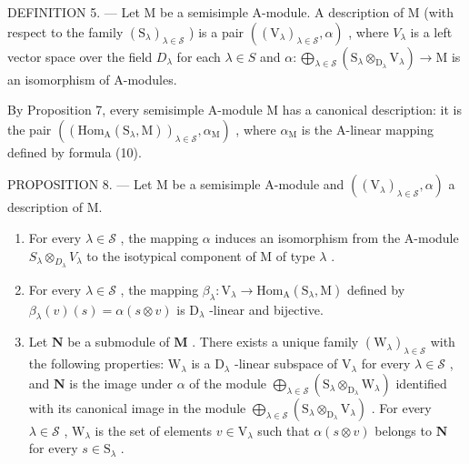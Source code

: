 DEFINITION 5. --- Let M be a semisimple A-module. A description of M (with respect to the family \((\mathrm{S}_{\lambda})_{\lambda\in\mathcal{S}}\) ) is a pair \(((\mathrm{V}_{\lambda})_{\lambda\in\mathcal{S}},\alpha)\) , where \(V_{\lambda}\) is a left vector space over the field \(D_{\lambda}\) for each \(\lambda\in S\) and \(\alpha:\bigoplus_{\lambda\in\mathcal{S}}(\mathrm{S}_{\lambda}\otimes_{\mathrm{D}_{\lambda}}\mathrm{V}_{\lambda})\to\mathrm{M}\) is an isomorphism of A-modules.

By Proposition 7, every semisimple A-module M has a canonical description: it is the pair \(\left(\left(\mathrm{Hom}_{\mathrm{A}}\left(\mathrm{S}_{\lambda},\mathrm{M}\right)\right)_{\lambda \in \mathcal{S}},\alpha_{\mathrm{M}}\right)\) , where \(\alpha_{\mathrm{M}}\) is the A-linear mapping defined by formula (10).

PROPOSITION 8. --- Let M be a semisimple A-module and \(((\mathrm{V}_{\lambda})_{\lambda \in \mathcal{S}}, \alpha)\) a description of M.

\begin{enumerate}
\def\labelenumi{\alph{enumi})}
\item
  For every \(\lambda \in \mathcal{S}\) , the mapping \(\alpha\) induces an isomorphism from the A-module \(S_{\lambda} \otimes_{D_{\lambda}} V_{\lambda}\) to the isotypical component of M of type \(\lambda\) .
\item
  For every \(\lambda \in \mathcal{S}\) , the mapping \(\beta_{\lambda} : \mathrm{V}_{\lambda} \to \mathrm{Hom}_{\mathrm{A}}(\mathrm{S}_{\lambda}, \mathrm{M})\) defined by \(\beta_{\lambda}(v)(s) = \alpha(s \otimes v)\) is \(\mathrm{D}_{\lambda}\) -linear and bijective.
\item
  Let \(\mathbf{N}\) be a submodule of \(\mathbf{M}\) . There exists a unique family \((\mathrm{W}_{\lambda})_{\lambda \in \mathcal{S}}\) with the following properties: \(\mathrm{W}_{\lambda}\) is a \(\mathrm{D}_{\lambda}\) -linear subspace of \(\mathrm{V}_{\lambda}\) for every \(\lambda \in \mathcal{S}\) , and \(\mathbf{N}\) is the image under \(\alpha\) of the module \(\bigoplus_{\lambda \in \mathcal{S}} (\mathrm{S}_{\lambda} \otimes_{\mathrm{D}_{\lambda}} \mathrm{W}_{\lambda})\) identified with its canonical image in the module \(\bigoplus_{\lambda \in \mathcal{S}} (\mathrm{S}_{\lambda} \otimes_{\mathrm{D}_{\lambda}} \mathrm{V}_{\lambda})\) . For every \(\lambda \in \mathcal{S}\) , \(\mathrm{W}_{\lambda}\) is the set of elements \(v \in \mathrm{V}_{\lambda}\) such that \(\alpha(s \otimes v)\) belongs to \(\mathbf{N}\) for every \(s \in \mathrm{S}_{\lambda}\) .
\end{enumerate}

